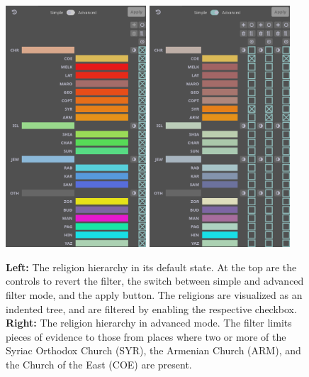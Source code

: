 \begin{figure}[tb]
  \centering
  \includegraphics[height=9cm]{../src/assets/visualization-documentation/religion-hierarchy-1.png}%
  \hspace{1cm}
  \includegraphics[height=9cm]{../src/assets/visualization-documentation/religion-hierarchy-2.png}
  \caption{\textbf{Left:}
    The religion hierarchy in its default state.
    At the top are the controls to revert the filter, the switch between simple and advanced filter mode, and the apply button.
    The religions are visualized as an indented tree, and are filtered by enabling the respective checkbox.
    \\
    \textbf{Right:}
    The religion hierarchy in advanced mode.
    The filter limits pieces of evidence to those from places where two or more of the Syriac Orthodox Church (SYR), the Armenian Church (ARM), and the Church of the East (COE) are present.
  }
\end{figure}

